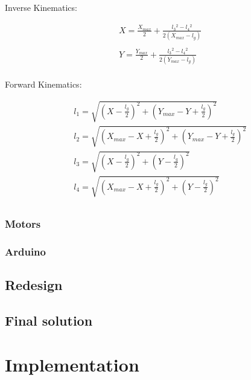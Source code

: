 \documentclass[conference]{IEEEtran}
\begin{document}
Inverse Kinematics:

\begin{equation}
\begin{aligned}
&X = \frac{X_{max}}{2} + \frac{l_3{}^2 - l_4{}^2}{2\left(X_{max} - l_g\right)}\\ \\
&Y = \frac{Y_{max}}{2} + \frac{l_3{}^2 - l_4{}^2}{2\left(Y_{max} - l_g\right)}\\
\end{aligned}
\end{equation}

Forward Kinematics:

\begin{equation}
\begin{aligned}
&l_1 = \sqrt{\left(X - \frac{l_g}{2}\right)^2 + \left(Y_{max}-Y+\frac{l_g}{2}\right)^2}\\
&l_2 = \sqrt{\left(X_{max}-X+\frac{l_g}{2}\right)^2 + \left(Y_{max}-Y+\frac{l_g}{2}\right)^2}\\
&l_3 = \sqrt{\left(X-\frac{l_g}{2}\right)^2 + \left(Y-\frac{l_g}{2}\right)^2}\\
&l_4 = \sqrt{\left(X_{max}-X+\frac{l_g}{2}\right)^2 + \left(Y-\frac{l_g}{2}\right)^2}\\
\end{aligned}
\end{equation}

\subsubsection{Motors}
\subsubsection{Arduino}
\subsection{Redesign}
\subsection{Final solution}


\section{Implementation}
\end{document}

